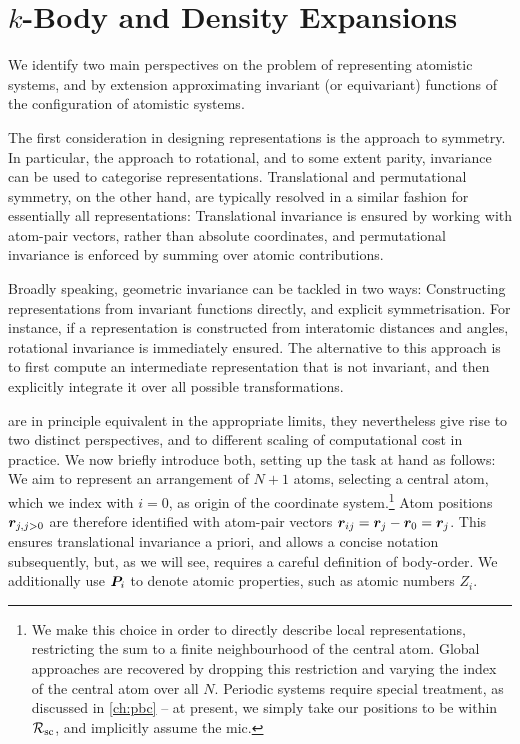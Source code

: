 \section{$k$-Body and Density Expansions}

We identify two main perspectives on the problem of representing atomistic systems, and by extension approximating invariant (or equivariant) functions of the configuration of atomistic systems.

The first consideration in designing representations is the approach to symmetry. In particular, the approach to rotational, and to some extent parity, invariance can be used to categorise representations. Translational and permutational symmetry, on the other hand, are typically resolved in a similar fashion for essentially all representations: Translational invariance is ensured by working with atom-pair vectors, rather than absolute coordinates, and permutational invariance is enforced by summing over atomic contributions.

Broadly speaking, geometric invariance can be tackled in two ways: Constructing representations from invariant functions directly, and explicit symmetrisation. For instance, if a representation is constructed from interatomic distances and angles, rotational invariance is immediately ensured. The alternative to this approach is to first compute an intermediate representation that is not invariant, and then explicitly integrate it over all possible transformations. 

 are in principle equivalent in the appropriate limits, they nevertheless give rise to two distinct perspectives, and to different scaling of computational cost in practice. We now briefly introduce both, setting up the task at hand as follows: We aim to represent an arrangement of $N+1$ atoms, selecting a central atom, which we index with $i=0$, as origin of the coordinate system.\footnote[][-5\baselineskip]{
	We make this choice in order to directly describe local representations, restricting the sum to a finite neighbourhood of the central atom. Global approaches are recovered by dropping this restriction and varying the index of the central atom over all $N$. Periodic systems require special treatment, as discussed in \cref{ch:pbc} -- at present, we simply take our positions to be within $\mathcal{R_{\text{sc}}}$, and implicitly assume the \gls{mic}.
} Atom positions $\boldsymbol{r}_{j, j>0}$ are therefore identified with atom-pair vectors $\boldsymbol{r}_{ij} = \boldsymbol{r}_j - \boldsymbol{r}_0 = \boldsymbol{r}_j$. This ensures translational invariance a priori, and allows a concise notation subsequently, but, as we will see, requires a careful definition of body-order. We additionally use $\boldsymbol{P}_i$ to denote atomic properties, such as atomic numbers $Z_i$.

